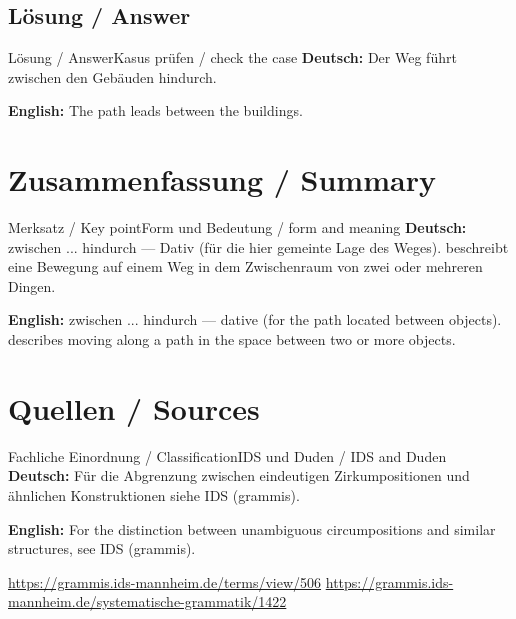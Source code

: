 \documentclass[a4paper,11pt]{article}
\newcommand{\GermanText}[1]{\textbf{Deutsch: }#1\par}
\newcommand{\EnglishText}[1]{{\small\color{SoftGray}\textbf{English: }#1\par}}
\begin{document}
\subsection{Lösung / Answer}
\begin{grammarentry}{Lösung / Answer}{Kasus prüfen / check the case}
\GermanText{Der Weg führt zwischen den Gebäuden hindurch.}
\EnglishText{The path leads between the buildings.}
\end{grammarentry}
\section{Zusammenfassung / Summary}
\begin{grammarentry}{Merksatz / Key point}{Form und Bedeutung / form and meaning}
\GermanText{zwischen ... hindurch — Dativ (für die hier gemeinte Lage des Weges). beschreibt eine Bewegung auf einem Weg in dem Zwischenraum von zwei oder mehreren Dingen.}
\EnglishText{zwischen ... hindurch — dative (for the path located between objects). describes moving along a path in the space between two or more objects.}
\end{grammarentry}
\section{Quellen / Sources}
\begin{grammarentry}{Fachliche Einordnung / Classification}{IDS und Duden / IDS and Duden}
\GermanText{Für die Abgrenzung zwischen eindeutigen Zirkumpositionen und ähnlichen Konstruktionen siehe IDS (grammis).}
\EnglishText{For the distinction between unambiguous circumpositions and similar structures, see IDS (grammis).}
\url{https://grammis.ids-mannheim.de/terms/view/506}
\url{https://grammis.ids-mannheim.de/systematische-grammatik/1422}
\end{grammarentry}
\end{document}
